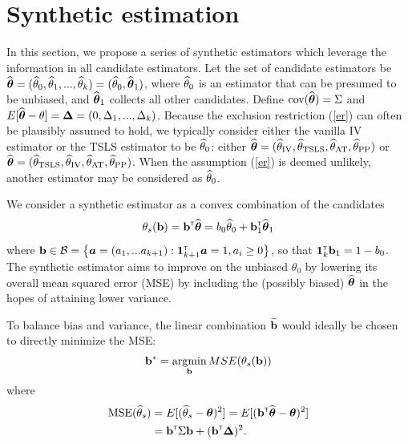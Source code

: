 \documentclass{article}
\def\siv{_{\text{IV}}}
\def\spp{_{\text{PP}}}
\def\sat{_{\text{AT}}}
\def\stsls{_{\text{TSLS}}}
\begin{document}
\section{Synthetic estimation}

In this section, we propose a series of synthetic estimators which leverage the information in all candidate estimators. Let the set of candidate estimators be ${\widehat{\boldsymbol{\theta}}} = ({\widehat\theta}_0, {\widehat\theta}_1, ..., {\widehat\theta}_k) = ({\widehat\theta}_0, {\widehat{\boldsymbol{\theta}}}_1)$, where ${\widehat\theta}_0$ is an estimator that can be presumed to be unbiased, and ${\widehat{\boldsymbol{\theta}}}_1$ collects all other candidates. Define $\mbox{cov}({\widehat{\boldsymbol{\theta}}}) = \Sigma$ and $E[{\widehat{\boldsymbol{\theta}}} - \theta] = \boldsymbol{\Delta} = (0, \Delta_1, ..., \Delta_k)$. Because the exclusion restriction (\ref{er}) can often be plausibly assumed to hold, we typically consider either the vanilla IV estimator or the TSLS estimator to be ${\widehat\theta}_0$: either $\bthetahat = (\thetahat\siv, \thetahat\stsls, \thetahat\sat, \thetahat\spp)$ or $\bthetahat = (\thetahat\stsls, \thetahat\siv, \thetahat\sat, \thetahat\spp)$. When the assumption (\ref{er}) is deemed unlikely, another estimator may be considered as ${\widehat\theta}_0$. 

We consider a synthetic estimator as a convex combination of the candidates \[
\theta_s({\bf b}) = {\bf b}^{{\sf \scriptscriptstyle{T}}}{\widehat{\boldsymbol{\theta}}} = b_0{\widehat\theta}_0 + {\bf b}_1^{{\sf \scriptscriptstyle{T}}}{\widehat{\boldsymbol{\theta}}}_1
\]
where ${\bf b} \in {\cal B} = \left\{{\mbox{\boldmath$a$}} = (a_1, ... a_{k+1}): {\bf 1}_{k+1}^{{\sf \scriptscriptstyle{T}}}{\mbox{\boldmath$a$}} = 1, a_i \geq 0\right\}$, so that ${\bf 1}_k^{{\sf \scriptscriptstyle{T}}}{\bf b}_1 = 1 - b_0$. The synthetic estimator aims to improve on the unbiased $\theta_0$ by lowering its overall mean squared error (MSE) by including the (possibly biased) ${\widehat{\boldsymbol{\theta}}}$ in the hopes of attaining lower variance.

To balance bias and variance, the linear combination ${\widetilde {{\bf b}}}$ would ideally be chosen to directly minimize the MSE:
\begin{align}
    {\bf b}^* = \mathop{\mbox{argmin}}_{{\bf b}}MSE(\theta_s({\bf b}))
\end{align}
where 
\begin{align*}
\text{MSE}({\widehat\theta}_s) &= E[({\widehat\theta}_s - \boldsymbol{\theta})^2] = E[({\bf b}^{{\sf \scriptscriptstyle{T}}}{\widehat{\boldsymbol{\theta}}} - \boldsymbol{\theta})^2]\\
&= {\bf b}^{{\sf \scriptscriptstyle{T}}}\Sigma{\bf b} + ({\bf b}^{{\sf \scriptscriptstyle{T}}} \boldsymbol{\Delta})^2.
\end{align*}
\end{document}
